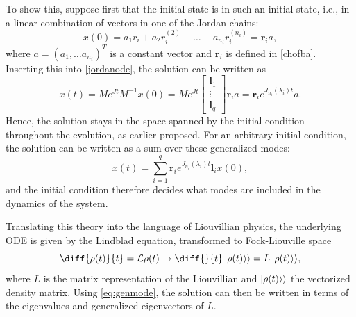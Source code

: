 \documentclass[../main.tex]{subfiles}
\begin{document}
To show this, suppose first that the initial state is in such an initial state, i.e., in a linear combination of vectors in one of the Jordan chains:
\begin{equation}
    x(0) = a_1r_i + a_2r_i^{(2)} + \dots + a_{n_i}r_i^{(n_i)} = \boldsymbol{r}_ia,
\end{equation}
where $a = (a_1, \dots a_{n_i})^T$ is a constant vector and $\boldsymbol{r}_i$ is defined in \cref{chofba}. Inserting this into \cref{jordanode}, the solution can be written as
\begin{equation}
    x(t) = Me^{Jt}M^{-1}x(0) = Me^{Jt} \begin{bmatrix} \boldsymbol{l}_1 \\ \vdots \\ \boldsymbol{l}_{q} \end{bmatrix} \boldsymbol{r}_ia = \boldsymbol{r}_i e^{J_{n_i}(\lambda_i)t} a.
\end{equation}
Hence, the solution stays in the space spanned by the initial condition throughout the evolution, as earlier proposed. For an arbitrary initial condition, the solution can be written as a sum over these generalized modes: 
\begin{equation}\label{eq:genmode}
    x(t) = \sum_{i=1}^q \boldsymbol{r}_i e^{J_{n_i}(\lambda_i)t} \boldsymbol{l}_i x(0),
\end{equation}
and the initial condition therefore decides what modes are included in the dynamics of the system.

Translating this theory into the language of Liouvillian physics, the underlying ODE is given by the Lindblad equation, transformed to Fock-Liouville space    
\begin{equation}\label{eq:lindfock}
    \diff{\rho(t)}{t}= \mathcal{L} \rho(t) \rightarrow \diff{}{t}\ket{\rho(t)}\rangle = L \ket{\rho(t)}\rangle,
\end{equation}
where $L$ is the matrix representation of the Liouvillian and $\ket{\rho(t)}\rangle$ the vectorized density matrix. Using \cref{eq:genmode}, the solution can then be written in terms of the eigenvalues and generalized eigenvectors of $L$.
\end{document}
